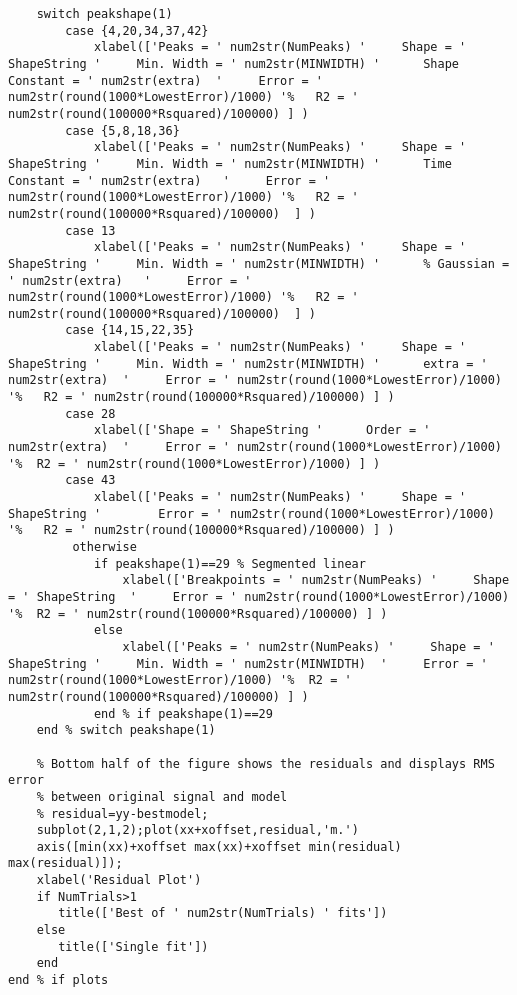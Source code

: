 \begin{lstlisting}
    switch peakshape(1)
        case {4,20,34,37,42}
            xlabel(['Peaks = ' num2str(NumPeaks) '     Shape = ' ShapeString '     Min. Width = ' num2str(MINWIDTH) '      Shape Constant = ' num2str(extra)  '     Error = ' num2str(round(1000*LowestError)/1000) '%   R2 = ' num2str(round(100000*Rsquared)/100000) ] )
        case {5,8,18,36}
            xlabel(['Peaks = ' num2str(NumPeaks) '     Shape = ' ShapeString '     Min. Width = ' num2str(MINWIDTH) '      Time Constant = ' num2str(extra)   '     Error = ' num2str(round(1000*LowestError)/1000) '%   R2 = ' num2str(round(100000*Rsquared)/100000)  ] )
        case 13
            xlabel(['Peaks = ' num2str(NumPeaks) '     Shape = ' ShapeString '     Min. Width = ' num2str(MINWIDTH) '      % Gaussian = ' num2str(extra)   '     Error = ' num2str(round(1000*LowestError)/1000) '%   R2 = ' num2str(round(100000*Rsquared)/100000)  ] )
        case {14,15,22,35}
            xlabel(['Peaks = ' num2str(NumPeaks) '     Shape = ' ShapeString '     Min. Width = ' num2str(MINWIDTH) '      extra = ' num2str(extra)  '     Error = ' num2str(round(1000*LowestError)/1000) '%   R2 = ' num2str(round(100000*Rsquared)/100000) ] )
        case 28
            xlabel(['Shape = ' ShapeString '      Order = ' num2str(extra)  '     Error = ' num2str(round(1000*LowestError)/1000) '%  R2 = ' num2str(round(1000*LowestError)/1000) ] )
        case 43
            xlabel(['Peaks = ' num2str(NumPeaks) '     Shape = ' ShapeString '        Error = ' num2str(round(1000*LowestError)/1000) '%   R2 = ' num2str(round(100000*Rsquared)/100000) ] )
         otherwise
            if peakshape(1)==29 % Segmented linear
                xlabel(['Breakpoints = ' num2str(NumPeaks) '     Shape = ' ShapeString  '     Error = ' num2str(round(1000*LowestError)/1000) '%  R2 = ' num2str(round(100000*Rsquared)/100000) ] )
            else
                xlabel(['Peaks = ' num2str(NumPeaks) '     Shape = ' ShapeString '     Min. Width = ' num2str(MINWIDTH)  '     Error = ' num2str(round(1000*LowestError)/1000) '%  R2 = ' num2str(round(100000*Rsquared)/100000) ] )
            end % if peakshape(1)==29
    end % switch peakshape(1)

    % Bottom half of the figure shows the residuals and displays RMS error
    % between original signal and model
    % residual=yy-bestmodel;
    subplot(2,1,2);plot(xx+xoffset,residual,'m.')
    axis([min(xx)+xoffset max(xx)+xoffset min(residual) max(residual)]);
    xlabel('Residual Plot')
    if NumTrials>1
       title(['Best of ' num2str(NumTrials) ' fits'])
    else
       title(['Single fit'])
    end
end % if plots


\end{lstlisting}
